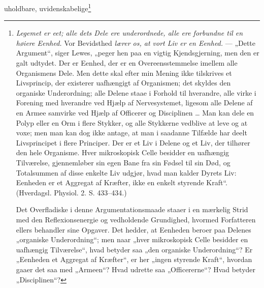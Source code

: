 \documentclass[12pt,a4paper]{book}
\begin{document}
uholdbare, uvidenskabelige\footnote{\emph{Legemet er eet; alle dets Dele ere
underordnede, alle ere forbundne til en høiere Eenhed.} Vor Bevidsthed
\emph{lærer os, at vort Liv er en Eenhed.} --- „Dette Argument“, siger Lewes,
„peger hen paa en vigtig Kjendsgjerning, men den
er galt udtydet. Der er Eenhed, der er en Overeensstemmelse imellem alle
Organismens Dele. Men dette skal efter min Mening ikke tilskrives et
Livsprincip, der existerer uafhængigt af Organismen; det skyldes den
organiske Underordning; alle Delene staae i Forhold til hverandre, alle
virke i Forening med hverandre ved Hjælp af Nervesystemet, ligesom alle
Delene af en Armee samvirke ved Hjælp af Officerer og Disciplinen \dots{}
Man kan dele en Polyp eller en Orm i flere Stykker, og alle Stykkerne
vedblive at leve og at voxe; men man kan dog ikke antage, at man i
saadanne Tilfælde har deelt Livsprincipet i flere Principer. Der er et
Liv i Delene og et Liv, der tilhører den hele Organisme. Hver
mikroskopisk Celle besidder en uafhængig Tilværelse, gjennemløber sin
egen Bane fra sin Fødsel til sin Død, og Totalsummen af disse enkelte Liv
udgjør, hvad man kalder Dyrets Liv: Eenheden er et Aggregat af Kræfter,
ikke en enkelt styrende Kraft“. (Hverdagsl. Physiol. 2. S. 433--434.)

Det Overfladiske i denne Argumentationsmaade staaer i en mærkelig Strid
med den Reflexionsenergie og vedholdende Grundighed, hvormed Forfatteren
ellers behandler sine Opgaver. Det hedder, at Eenheden beroer paa
Delenes „organiske Underordning“; men naar „hver mikroskopisk Celle
besidder en uafhængig Tilværelse“, hvad betyder saa „den organiske
Underordning“? Er „Eenheden et Aggregat af Kræfter“, er her „ingen
styrende Kraft“, hvordan gaaer det saa med „Armeen“? Hvad udrette saa
„Officererne“? Hvad betyder „Disciplinen“?

}
\end{document}
